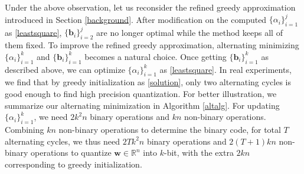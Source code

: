 \documentclass{article} %
\newcommand{\w}{\mathbf{w}}
\renewcommand{\b}{\mathbf{b}}
\newcommand{\<}{\left\langle}
\renewcommand{\>}{\right\rangle}
\begin{document}
Under the above observation, let us reconsider the refined greedy approximation \citep{refinedgreedy} introduced in Section \ref{background}. After modification on the computed $\{\alpha_{i}\}_{i=1}^{j}$ as \eqref{leastsquare},  $\{\b_{i} \}_{i=2}^j$ are no longer optimal while the method keeps all of them fixed. To improve the refined greedy approximation,  alternating minimizing $\{\alpha_i\}_{i=1}^k$ and $\{\b_i\}_{i=1}^k$ becomes a natural choice. Once getting $\{\b_i\}_{i=1}^k$ as described above, we can optimize $\{\alpha_i\}_{i=1}^k$ as \eqref{leastsquare}. In real experiments, we find that by greedy initialization as \eqref{solution}, only two alternating cycles is good enough to find high precision quantization. For better illustration, we summarize our alternating minimization in Algorithm \ref{altalg}.  For updating $\{\alpha_{i}\}_{i=1}^{k}$, we need $2k^2n$ binary operations and $kn$ non-binary operations. Combining  $kn$ non-binary operations to determine the binary code, for total $T$ alternating cycles, we thus need $2Tk^2n$ binary operations and $2(T+1)kn$ non-binary operations to quantize $\w \in \mathbb{R}^n$ into $k$-bit, with the extra $2kn$ corresponding to greedy initialization. 
  
\end{document}
